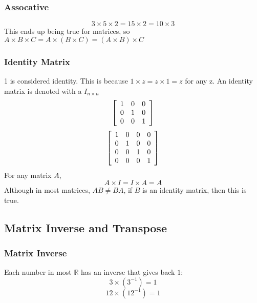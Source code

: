 \documentclass{article}
\begin{document}
\subsubsection{Assocative}
\[
    3 \times 5 \times 2 = 15 \times 2 = 10 \times 3
\]
This ends up being true for matrices, so $A \times B \times C = A \times (B \times C) = (A \times B) \times C$

\subsubsection{Identity Matrix}
1 is considered identity. This is because $1 \times z = z \times 1 = z$ for any z. An identity matrix is denoted with a $I_{n \times n}$
\[
    \left[\begin{array}[]{ccc}
        1 & 0 & 0 \\
        0 & 1 & 0 \\
        0 & 0 & 1
    \end{array}\right]
\]
\[
    \left[\begin{array}[]{cccc}
        1 & 0 & 0 & 0\\
        0 & 1 & 0 & 0\\
        0 & 0 & 1 & 0\\
        0 & 0 & 0 & 1\\
    \end{array}\right]
\]
For any matrix $A$,
\[
    A \times I = I \times A = A
\]
Although in most matrices, $AB \neq BA$, if $B$ is an identity matrix, then this is true. 

\subsection{Matrix Inverse and Transpose}
\subsubsection{Matrix Inverse}
Each number in most $\mathbb{R}$ has an inverse that gives back $1$:
\[
    3 \times (3^{-1}) = 1
\]
\[
    12 \times (12^{-1}) = 1
\]
\end{document}
